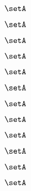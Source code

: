 {\begin{forslides}
        \begin{equation}
            \label{eq:slides-translation-143}
            \setA
        \end{equation}

        \begin{equation}
            \label{eq:slides-translation-144}
            \setA
        \end{equation}

        \begin{equation}
            \label{eq:slides-translation-145}
            \setA
        \end{equation}

        \begin{equation}
            \label{eq:slides-translation-146}
            \setA
        \end{equation}

        \begin{equation}
            \label{eq:slides-translation-147}
            \setA
        \end{equation}

        \begin{equation}
            \label{eq:slides-translation-148}
            \setA
        \end{equation}

        \begin{equation}
            \label{eq:slides-translation-149}
            \setA
        \end{equation}

        \begin{equation}
            \label{eq:slides-translation-150}
            \setA
        \end{equation}

        \begin{equation}
            \label{eq:slides-translation-151}
            \setA
        \end{equation}

        \begin{equation}
            \label{eq:slides-translation-152}
            \setA
        \end{equation}

        \begin{equation}
            \label{eq:slides-translation-153}
            \setA
        \end{equation}

        \begin{equation}
            \label{eq:slides-translation-154}
            \setA
        \end{equation}


\end{forslides}}

